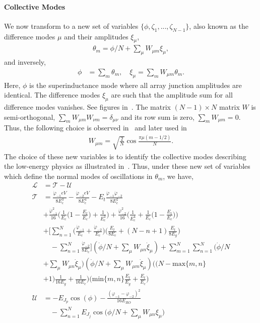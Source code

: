 \documentclass[%
reprint,
superscriptaddress,
 amsmath,amssymb,
 aps,
 prx,
longbibliography,
floatfix,
]{revtex4-2}
\begin{document}
\paragraph{Collective Modes} 
We now transform to a new set of variables $\{\phi,\zeta_1,...,\zeta_{N-1}\}$, also known as the difference modes $\mu$ and their amplitudes $\xi_\mu$,
\begin{align}
    \theta_m=\phi/N+\sum_\mu W_{\mu m}\xi_\mu,
\end{align}
and inversely,
\begin{align}
    \phi&=\sum_{m}\theta_m,\quad \xi_\mu=\sum_m W_{\mu m}\theta_m.
\end{align}
Here, $\phi$ is the superinductance mode where all array junction amplitudes are identical. The difference modes $\xi_\mu$ are such that the amplitude sum for all difference modes vanishes. See figures in~\cite{ferguson2013symmetries}. The matrix $(N-1)\times N$ matrix $W$ is semi-orthogonal, $\sum_m W_{\mu m}W_{\nu m}=\delta_{\mu \nu}$ and its row sum is zero, $\sum_mW_{\mu m}=0$. Thus, the following choice is observed in~\cite{ferguson2013symmetries} and later used in~\cite{viola2015collective}
\begin{align}
    W_{\mu m}=\sqrt{\frac{2}{N}}\cos{\frac{\pi\mu(m-1/2)}{N}}.
\end{align}
The choice of these new variables is to identify the collective modes describing the low-energy physics as illustrated in~\cite{catelani2011relaxation,koch2009charging,manucharyan2009fluxonium}. Thus, under these new set of variables which define the normal modes of oscillations in $\theta_m$, we have,
\begin{align}
    \mathcal{L}&=\mathcal{T}-\mathcal{U}\\
    \mathcal{T}&=\frac{\dot{\varphi}_{-1}eV}{8E_c^3}-\frac{\dot{\varphi}_{-2}eV}{8E_c^4}-E_t\frac{\dot{\varphi}_{-1}\dot{\varphi}_{-2}}{8E_c^2}\nonumber\\
    &+\frac{\dot{\varphi}^2_{-1}}{16}\Big(\frac{1}{E_c}\Big(1-\frac{E_t}{E_c}\Big)+\frac{1}{E_c^3}\Big)+\frac{\dot{\varphi}^2_{-2}}{16}\Big(\frac{1}{E_c^4}+\frac{1}{E_c}\Big(1-\frac{E_t}{E_c}\Big)\Big)\nonumber\\
      &+\Big[\sum_{n=1}^N\Big(\frac{\dot{\varphi}_{-1}}{E_c}+\frac{\dot{\varphi}_{-2}}{E_c}\Big)\Big(\frac{E_t}{8E_c}+(N-n+1)\frac{E_t}{8E_g}\Big)\nonumber\\&\quad-\sum_{n=1}^N\frac{\dot{\varphi}_{-2}}{8E_c}\Big](\dot{\phi}/N+\sum_\mu W_{\mu n}\dot{\xi}_\mu)+\sum_{m=1}^N\sum_{n=1}^N(\dot{\phi}/N\nonumber\\
  &+\sum_\mu W_{\mu n}\dot{\xi}_\mu)(\dot{\phi}/N+\sum_\mu W_{\mu m}\dot{\xi}_\mu)\Big( (N-\text{max}\{m,n\}\nonumber\\&+1)\frac{1}{16E_g}+\frac{1}{16E_c}\Big)\Big(\text{min}\{m,n\}\frac{E_t}{E_g}+\frac{E_t}{E_c}\Big)\label{eq:kin-energy}\\
    \mathcal{U}&=-E_{J_p}\cos(\phi)-\frac{(\varphi_{-1}-\varphi_{-2})^2}{16E_{RO}}\nonumber\\&\quad-\sum_{n=1}^NE_{J_j}\cos\Big(\phi/N+\sum_\mu W_{\mu n}\xi_\mu\Big)\label{eq:pot-energy}
\end{align}
\end{document}
